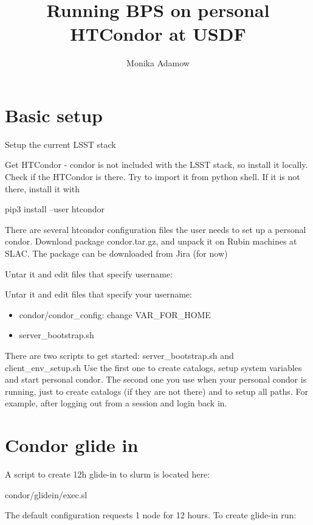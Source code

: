 \documentclass[OPS,authoryear,toc]{lsstdoc}
\title{Running BPS on personal HTCondor at USDF}
\author{%
Monika Adamow
}
\date{\vcsDate}
\begin{document}
\maketitle

\section{Basic setup}
 Setup the current LSST stack 

Get HTCondor - condor is not included with the LSST stack, so install it locally. 
Check if the HTCondor is there. Try to import it from python shell. If it is not there, install it with

 pip3 install --user htcondor  
 
There are several htcondor configuration files the user needs to set up a personal condor.
Download package condor.tar.gz, and unpack it on Rubin machines at SLAC.
The package can be downloaded from Jira (for now) 

Untar it and edit files that specify  username:

Untar it and edit files that specify your username:
\begin{itemize}
\item condor/condor_config: change  VAR_FOR_HOME
\item server_bootstrap.sh 
\end{itemize}

There are two scripts to get started: server_bootstrap.sh and  client_env_setup.sh
Use the first one to create catalogs, setup system variables and start personal condor.
The second one you use when your personal condor is running,  just to create catalogs (if they are not there) and to setup all paths.
For example, after logging out from a session and login back in.


\section{Condor glide in}
A script to create 12h glide-in to slurm is located here:

condor/glidein/exec.sl

The default configuration requests 1 node for 12 hours.
To create glide-in run:
\end{document}
